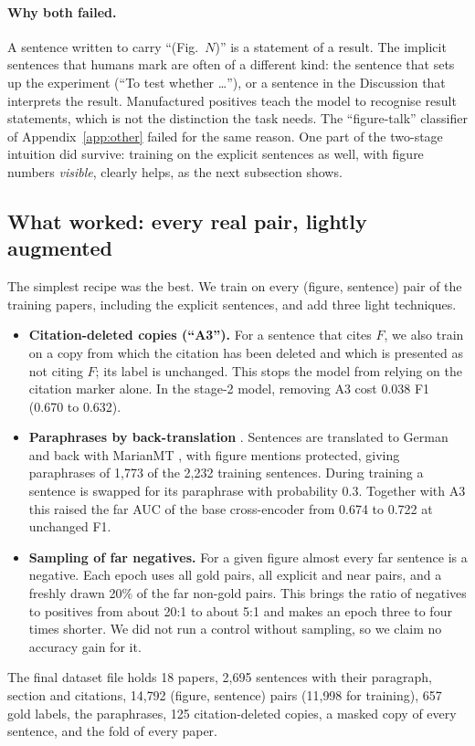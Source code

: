 \paragraph{Why both failed.} A sentence written to carry ``(Fig.~$N$)'' is a statement of a result. The
implicit sentences that humans mark are often of a different kind: the sentence that sets up the experiment
(``To test whether \ldots''), or a sentence in the Discussion that interprets the result. Manufactured
positives teach the model to recognise result statements, which is not the distinction the task needs. The
``figure-talk'' classifier of Appendix~\ref{app:other} failed for the same reason. One part of the
two-stage intuition did survive: training on the explicit sentences as well, with figure numbers
\emph{visible}, clearly helps, as the next subsection shows.

\subsection{What worked: every real pair, lightly augmented}
\label{sec:dataset}
The simplest recipe was the best. We train on every (figure, sentence) pair of the training papers, including
the explicit sentences, and add three light techniques.
\begin{itemize}
  \item \textbf{Citation-deleted copies (``A3'').} For a sentence that cites $F$, we also train on a copy from
        which the citation has been deleted and which is presented as not citing $F$; its label is unchanged.
        This stops the model from relying on the citation marker alone. In the stage-2 model, removing A3 cost
        0.038 F1 (0.670 to 0.632).
  \item \textbf{Paraphrases by back-translation} \citep{sennrich2016backtranslation}. Sentences are translated
        to German and back with MarianMT \citep{junczys2018marian}, with figure mentions protected, giving
        paraphrases of 1{,}773 of the 2{,}232 training sentences. During training a sentence is swapped for
        its paraphrase with probability 0.3. Together with A3 this raised the far AUC of the base cross-encoder
        from 0.674 to 0.722 at unchanged F1.
  \item \textbf{Sampling of far negatives.} For a given figure almost every far sentence is a negative. Each
        epoch uses all gold pairs, all explicit and near pairs, and a freshly drawn 20\% of the far non-gold
        pairs. This brings the ratio of negatives to positives from about 20:1 to about 5:1 and makes an epoch
        three to four times shorter. We did not run a control without sampling, so we claim no accuracy gain
        for it.
\end{itemize}
The final dataset file holds 18 papers, 2{,}695 sentences with their paragraph, section and citations,
14{,}792 (figure, sentence) pairs (11{,}998 for training), 657 gold labels, the paraphrases, 125
citation-deleted copies, a masked copy of every sentence, and the fold of every paper.

